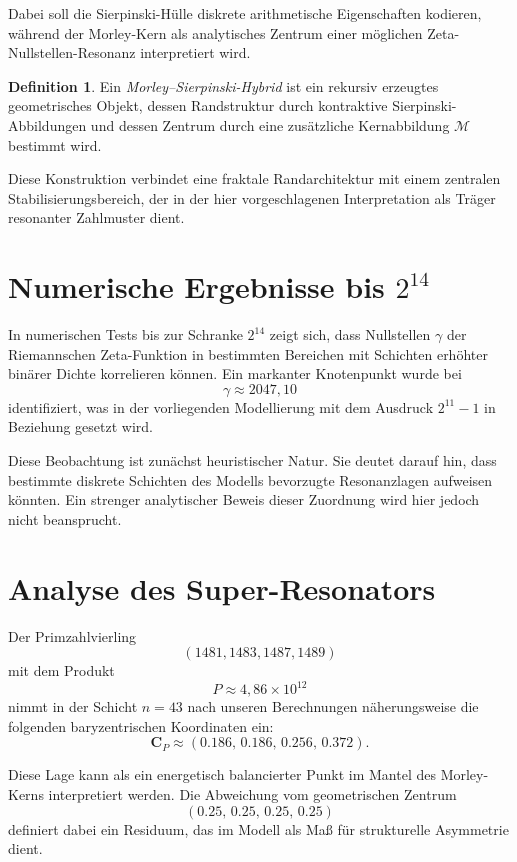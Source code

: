 \documentclass[11pt,a4paper,twocolumn]{article}
\theoremstyle{definition}
\newtheorem{definition}{Definition}
\theoremstyle{remark}
\begin{document}
	Dabei soll die Sierpinski-Hülle diskrete arithmetische Eigenschaften kodieren,
	während der Morley-Kern als analytisches Zentrum einer möglichen
	Zeta-Nullstellen-Resonanz interpretiert wird.
	
	\begin{definition}
		Ein \emph{Morley--Sierpinski-Hybrid} ist ein rekursiv erzeugtes geometrisches Objekt,
		dessen Randstruktur durch kontraktive Sierpinski-Abbildungen und dessen Zentrum
		durch eine zusätzliche Kernabbildung $\mathcal{M}$ bestimmt wird.
	\end{definition}
	
	Diese Konstruktion verbindet eine fraktale Randarchitektur mit einem zentralen
	Stabilisierungsbereich, der in der hier vorgeschlagenen Interpretation als
	Träger resonanter Zahlmuster dient.
	
	\section{Numerische Ergebnisse bis $2^{14}$}
	In numerischen Tests bis zur Schranke $2^{14}$ zeigt sich, dass Nullstellen
	$\gamma$ der Riemannschen Zeta-Funktion in bestimmten Bereichen mit Schichten
	erhöhter binärer Dichte korrelieren können. Ein markanter Knotenpunkt wurde
	bei
	\[
	\gamma \approx 2047{,}10
	\]
	identifiziert, was in der vorliegenden Modellierung mit dem Ausdruck
	$2^{11}-1$ in Beziehung gesetzt wird.
	
	Diese Beobachtung ist zunächst heuristischer Natur. Sie deutet darauf hin,
	dass bestimmte diskrete Schichten des Modells bevorzugte Resonanzlagen
	aufweisen könnten. Ein strenger analytischer Beweis dieser Zuordnung wird
	hier jedoch nicht beansprucht.
	
	\section{Analyse des Super-Resonators}
	Der Primzahlvierling
	\[
	(1481,1483,1487,1489)
	\]
	mit dem Produkt
	\[
	P \approx 4{,}86 \times 10^{12}
	\]
	nimmt in der Schicht $n=43$ nach unseren Berechnungen näherungsweise die
	folgenden baryzentrischen Koordinaten ein:
	\begin{equation}
		\mathbf{C}_{P} \approx (0.186,\,0.186,\,0.256,\,0.372).
	\end{equation}
	
	Diese Lage kann als ein energetisch balancierter Punkt im Mantel des
	Morley-Kerns interpretiert werden. Die Abweichung vom geometrischen Zentrum
	\[
	(0.25,\,0.25,\,0.25,\,0.25)
	\]
	definiert dabei ein Residuum, das im Modell als Maß für strukturelle
	Asymmetrie dient.
	
\end{document}
